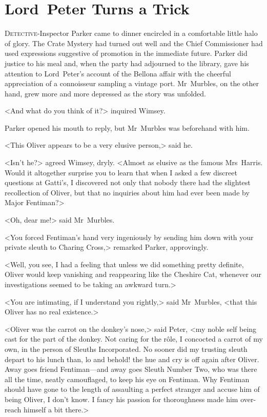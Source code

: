 \chapter{Lord~Peter Turns a Trick}
\lettrine{D}{etective}-Inspector Parker came to dinner encircled in a comfortable little halo of glory. The Crate Mystery had turned out well and the Chief Commissioner had used expressions suggestive of promotion in the immediate future. Parker did justice to his meal and, when the party had adjourned to the library, gave his attention to Lord~Peter's account of the Bellona affair with the cheerful appreciation of a connoisseur sampling a vintage port. Mr~Murbles, on the other hand, grew more and more depressed as the story was unfolded.

<And what do you think of it?> inquired Wimsey.

Parker opened his mouth to reply, but Mr~Murbles was beforehand with him.

<This Oliver appears to be a very elusive person,> said he.

<Isn't he?> agreed Wimsey, dryly. <Almost as elusive as the famous Mrs~Harris. Would it altogether surprise you to learn that when I asked a few discreet questions at Gatti's, I discovered not only that nobody there had the slightest recollection of Oliver, but that no inquiries about him had ever been made by Major Fentiman?>

<Oh, dear me!> said Mr~Murbles.

<You forced Fentiman's hand very ingeniously by sending him down with your private sleuth to Charing Cross,> remarked Parker, approvingly.

<Well, you see, I had a feeling that unless we did something pretty definite, Oliver would keep vanishing and reappearing like the Cheshire Cat, whenever our investigations seemed to be taking an awkward turn.>

<You are intimating, if I understand you rightly,> said Mr~Murbles, <that this Oliver has no real existence.>

<Oliver was the carrot on the donkey's nose,> said Peter, <my noble self being cast for the part of the donkey. Not caring for the rôle, I concocted a carrot of my own, in the person of Sleuths Incorporated. No sooner did my trusting sleuth depart to his lunch than, lo and behold! the hue and cry is off again after Oliver. Away goes friend Fentiman—and away goes Sleuth Number Two, who was there all the time, neatly camouflaged, to keep his eye on Fentiman. Why Fentiman should have gone to the length of assaulting a perfect stranger and accuse him of being Oliver, I don't know. I fancy his passion for thoroughness made him over-reach himself a bit there.>

